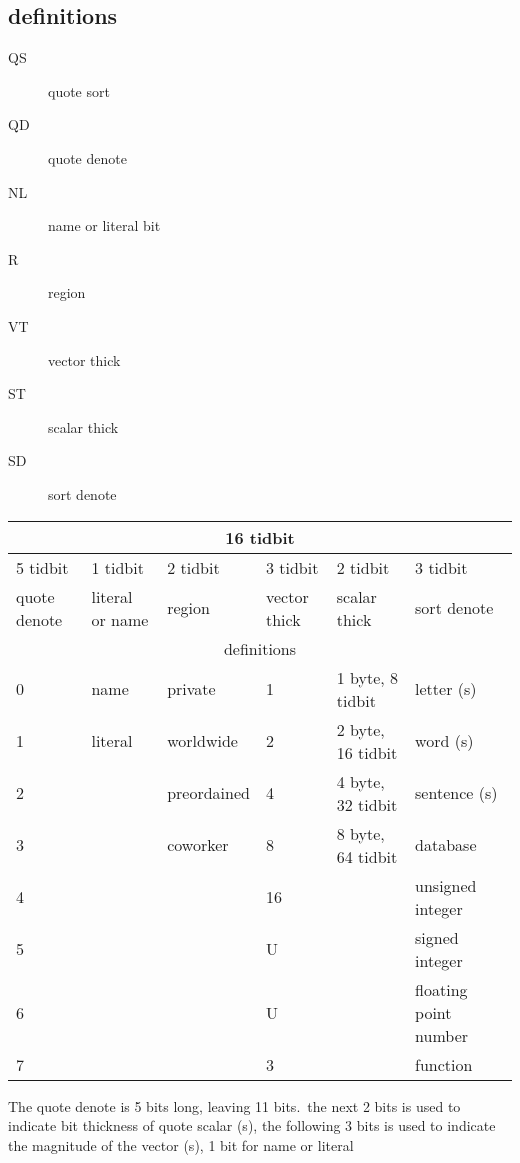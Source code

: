 \subsection{definitions}
\begin{description}
  \item [QS] quote sort 
  \item [QD] quote denote
  \item [NL] name or literal bit
  \item [R] region
  \item [VT] vector thick
  \item [ST] scalar thick
  \item [SD] sort denote
\end{description}

\begin{tabular}{*{6}{l}}
\toprule
\multicolumn{6}{|c|}{16 tidbit}\\
\midrule
5 tidbit     & 1 tidbit & 2 tidbit            & 3 tidbit        & 2 tidbit & 3 tidbit \\
\midrule
quote denote & literal or name & region & vector thick & scalar thick & sort denote \\
\midrule
\midrule
\multicolumn{6}{|c|}{definitions}\\
\bottomrule
0            & name     &  private  & 1  & 1 byte, 8 tidbit      & letter (s) \\
1            & literal  & worldwide    & 2 & 2 byte, 16 tidbit     & word (s) \\
2            &        & preordained  & 4 & 4 byte, 32 tidbit     & sentence (s) \\
3            &        & coworker & 8     & 8 byte, 64 tidbit     & database \\
4            &         & & 16                                  & & unsigned integer \\
5            &         & & U                                   & & signed integer \\
6            &         & & U                                   & & floating point number \\
7            &         & & 3                                   & & function \\
\bottomrule
\end{tabular}
The quote denote is 5 bits long, leaving 11 bits.\
the next 2 bits is used to indicate bit thickness of quote scalar (s),
the following 3 bits is used to indicate the magnitude of the vector (s),
1 bit for name or literal
